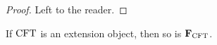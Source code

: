 \begin{proof}
Left to the reader.
\end{proof}
\begin{comment}
\begin{proof}
It is straightforward to verify the equalities
\begin{align*}
\pullbackpr{1}{\ectxext}{\eft}\circ\beta_2\circ\eext{3}
  & = \beta_1\circ\eft[2]\circ\eft[3]
  \\
\pullbackpr{1}{\ectxext}{\eft}\circ\eext{2}\circ\beta_3
  & = \beta_1\circ\eft[2]\circ\eft[3].
\end{align*}
Thus, it remains to verify that
\begin{equation*}
\pullbackpr{2}{\ectxext}{\eft}\circ\beta_2\circ\eext{3}
  = \pullbackpr{2}{\ectxext}{\eft}\circ\eext{2}\circ\beta_3.
\end{equation*}
It is straightforward to see that the diagram
\begin{equation*}
\begin{tikzcd}[column sep=large]
\stesysf_4
  \ar{dd}[swap]{\pullback{\pullbackpr{2}{\efamext}{\eft[1]}}{\pullbackpr{2}{\efamext}{\eft[1]}}{\efamext}{\eft[1]}}
  \ar{r}{\eext{3}}
  &
\stesysf_3
  \ar{r}{\beta_2}
  \ar{d}[swap]{\pullbackpr{2}{\efamext}{\eft[1]}}
  &
\stesysf_2
  \ar{dd}{\pullbackpr{2}{\ectxext}{\eft}}
  \\
  {} &
\stesysf_2
  \ar{dr}{\beta_1}
  \\
\stesysf_3
  \ar{ur}{\eext{2}}
  \ar{r}[swap]{\beta_2}
  &
\stesysf_2
  \ar{r}[swap]{\efamext}
  &
\stesysf
\end{tikzcd}
\end{equation*}
commutes. It is likewise straightforward to see that the diagram
\begin{equation*}
\begin{tikzcd}
\stesysf_4
  \ar{r}{\beta_3}
  \ar{d}[swap]{\pullback{\pullbackpr{2}{\efamext}{\eft[1]}}{\pullbackpr{2}{\efamext}{\eft[1]}}{\efamext}{\eft[1]}}
  &
\stesysf_3
  \ar{r}{\eext{2}}
  \ar{d}[swap]{\beta_2}
  &
\stesysf_2
  \ar{d}{\pullbackpr{2}{\ectxext}{\eft}}
  \\
\stesysf_3
  \ar{r}[swap]{\beta_2}
  &
\stesysf_2
  \ar{r}[swap]{\efamext}
  &
\stesysf
\end{tikzcd}
\end{equation*}
commutes, completing our goal.
\end{proof}
\end{comment}

\begin{thm}\label{famextobj}
If $\mathrm{CFT}$ is an extension object, then so is $\mathbf{F}_{\mathrm{CFT}}$.
\end{thm}

